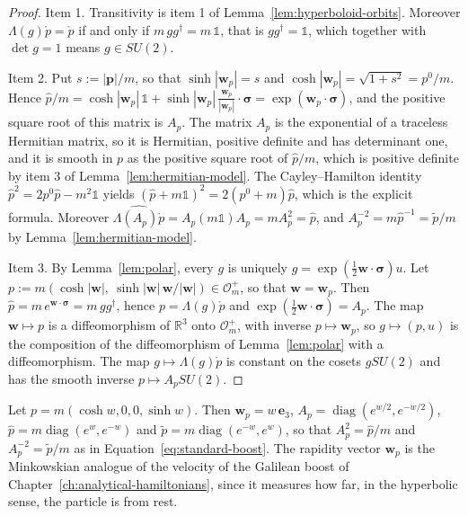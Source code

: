 	\begin{proof}
		Item 1. Transitivity is item 1 of Lemma~\ref{lem:hyperboloid-orbits}. Moreover $\Lambda(g)\mathring{p}=\mathring{p}$ if and only if $m\,gg^\dagger=m\,\mathbb{1}$, that is $gg^\dagger=\mathbb{1}$, which together with $\det g=1$ means $g\in SU(2)$.
		
		Item 2. Put $s:=|\mathbf{p}|/m$, so that $\sinh|\mathbf{w}_p|=s$ and $\cosh|\mathbf{w}_p|=\sqrt{1+s^2}=p^0/m$. Hence $\hat{p}/m=\cosh|\mathbf{w}_p|\,\mathbb{1}+\sinh|\mathbf{w}_p|\,\tfrac{\mathbf{w}_p}{|\mathbf{w}_p|}\cdot\boldsymbol{\sigma}=\exp(\mathbf{w}_p\cdot\boldsymbol{\sigma})$, and the positive square root of this matrix is $A_p$. The matrix $A_p$ is the exponential of a traceless Hermitian matrix, so it is Hermitian, positive definite and has determinant one, and it is smooth in $p$ as the positive square root of $\hat{p}/m$, which is positive definite by item 3 of Lemma~\ref{lem:hermitian-model}. The Cayley--Hamilton identity $\hat{p}^2=2p^0\hat{p}-m^2\mathbb{1}$ yields $(\hat{p}+m\mathbb{1})^2=2(p^0+m)\hat{p}$, which is the explicit formula. Moreover $\widehat{\Lambda(A_p)\mathring{p}}=A_p(m\mathbb{1})A_p=mA_p^2=\hat{p}$, and $A_p^{-2}=m\hat{p}^{-1}=\tilde{p}/m$ by Lemma~\ref{lem:hermitian-model}.
		
		Item 3. By Lemma~\ref{lem:polar}, every $g$ is uniquely $g=\exp(\tfrac12\mathbf{w}\cdot\boldsymbol{\sigma})u$. Let $p:=m(\cosh|\mathbf{w}|,\ \sinh|\mathbf{w}|\,\mathbf{w}/|\mathbf{w}|)\in\mathcal{O}_m^+$, so that $\mathbf{w}=\mathbf{w}_p$. Then $\hat{p}=m\,e^{\mathbf{w}\cdot\boldsymbol{\sigma}}=m\,gg^\dagger$, hence $p=\Lambda(g)\mathring{p}$ and $\exp(\tfrac12\mathbf{w}\cdot\boldsymbol{\sigma})=A_p$. The map $\mathbf{w}\mapsto p$ is a diffeomorphism of $\mathbb{R}^3$ onto $\mathcal{O}_m^+$, with inverse $p\mapsto\mathbf{w}_p$, so $g\mapsto(p,u)$ is the composition of the diffeomorphism of Lemma~\ref{lem:polar} with a diffeomorphism. The map $g\mapsto\Lambda(g)\mathring{p}$ is constant on the cosets $gSU(2)$ and has the smooth inverse $p\mapsto A_pSU(2)$.
	\end{proof}
	
	\begin{example}\label{ex:standard-boost}
		Let $p=m(\cosh w,0,0,\sinh w)$. Then $\mathbf{w}_p=w\,\mathbf{e}_3$, $A_p=\operatorname{diag}(e^{w/2},e^{-w/2})$, $\hat{p}=m\operatorname{diag}(e^w,e^{-w})$ and $\tilde{p}=m\operatorname{diag}(e^{-w},e^w)$, so that $A_p^2=\hat{p}/m$ and $A_p^{-2}=\tilde{p}/m$ as in Equation~\eqref{eq:standard-boost}. The rapidity vector $\mathbf{w}_p$ is the Minkowskian analogue of the velocity of the Galilean boost of Chapter~\ref{ch:analytical-hamiltonians}, since it measures how far, in the hyperbolic sense, the particle is from rest.
	\end{example}
	
